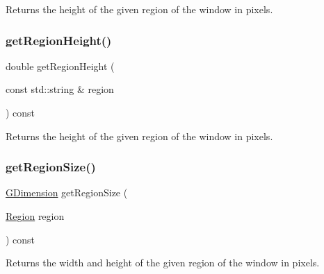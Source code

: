 Returns the height of the given region of the window in pixels. 

\mbox{\label{classGWindow_ae8a545e772745b89edaf9804a2dc0057}} 
\subsubsection{\texorpdfstring{get\+Region\+Height()}{getRegionHeight()}\hspace{0.1cm}{\footnotesize\ttfamily [2/2]}}
{\footnotesize\ttfamily double get\+Region\+Height (\begin{DoxyParamCaption}\item[{const std\+::string \&}]{region }\end{DoxyParamCaption}) const\hspace{0.3cm}{\ttfamily [virtual]}}



Returns the height of the given region of the window in pixels. 

\mbox{\label{classGWindow_a3b5db9ffbd4b32260f80634f162dba4e}} 
\subsubsection{\texorpdfstring{get\+Region\+Size()}{getRegionSize()}\hspace{0.1cm}{\footnotesize\ttfamily [1/2]}}
{\footnotesize\ttfamily \mbox{\hyperlink{structGDimension}{G\+Dimension}} get\+Region\+Size (\begin{DoxyParamCaption}\item[{\mbox{\hyperlink{classGWindow_a81a01a86de31071a92e6cce0bab9bc4b}{Region}}}]{region }\end{DoxyParamCaption}) const\hspace{0.3cm}{\ttfamily [virtual]}}



Returns the width and height of the given region of the window in pixels. 

\mbox{\label{classGWindow_a68b18b38b72cb8779fca0c3882549a6b}} 
